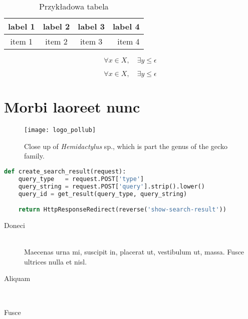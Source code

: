 \lipsum[5]

\begin{table}[h!tb]
  \center
  \caption{Przykładowa tabela}
  \label{my_table}
  \begin{tabular}{ | c | c | c | r | }
    \hline
  label 1 & label 2 & label 3 & label 4 \\
  \hline
  item 1  & item 2  & item 3  & item 4  \\
  \hline
  \end{tabular}
\end{table}

\lipsum[6]

\begin{equation}
 \forall x \in X, \quad \exists y \leq \epsilon
\end{equation}

\lipsum[7]

\begin{equation}
 \forall x \in X, \quad \exists y \leq \epsilon
\end{equation}

\lipsum[8]

\cleardoublepage\thispagestyle{plain}
\section{Morbi laoreet nunc}

\lipsum[9]

\begin{figure}[h!tb]
  \centering
  \texttt{[image: logo\_pollub]}
  \caption[Close up of \textit{Hemidactylus} sp.]%
  {Close up of \textit{Hemidactylus} sp., which is
  part the genus of the gecko family.}
\end{figure}

\lipsum[10]

\begin{lstlisting}[language=Python,caption={Przykładowy listing},label=lst:somelabel]
def create_search_result(request):
    query_type   = request.POST['type']
    query_string = request.POST['query'].strip().lower()
    query_id = get_result(query_type, query_string)

    return HttpResponseRedirect(reverse('show-search-result'))
\end{lstlisting}

\lipsum[11]


\begin{description}
  \item[Doneci]\hfill\\
    {Maecenas urna mi, suscipit in, placerat ut, vestibulum ut, massa. Fusce ultrices nulla et nisl.}
  \item[Aliquam]\hfill\\
    {\lipsum[15]}
  \item[Fusce]\hfill\\
    {\lipsum[14]}
\end{description}


